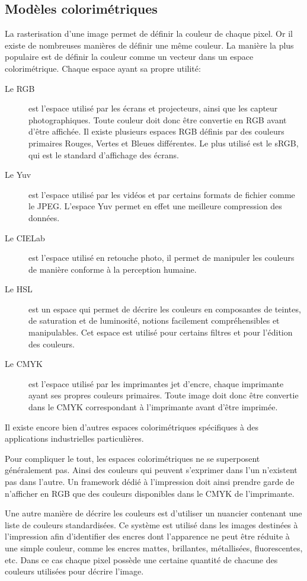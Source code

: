 		\subsection{Modèles colorimétriques}
			La rasterisation d'une image permet de définir la couleur de chaque pixel. Or il existe de nombreuses manières de définir une même couleur.
			La manière la plus populaire est de définir la couleur comme un vecteur dans un espace colorimétrique. Chaque espace ayant sa propre utilité:
			\begin{description}
				\item[Le RGB] est l'espace utilisé par les écrans et projecteurs, ainsi que les capteur photographiques. Toute couleur doit donc être
				convertie en RGB avant d'être affichée. Il existe plusieurs espaces RGB définis par des couleurs primaires Rouges, Vertes et Bleues différentes.
				Le plus utilisé est le sRGB, qui est le standard d'affichage des écrans\cite{reviewrgb}.
				\item[Le Yuv] est l'espace utilisé par les vidéos et par certains formats de fichier comme le JPEG.
				L'espace Yuv permet en effet une meilleure compression des données.
				\item[Le CIELab] est l'espace utilisé en retouche photo, il permet de manipuler les couleurs de manière conforme à la perception humaine.
				\item[Le HSL] est un espace qui permet de décrire les couleurs en composantes de teintes, de saturation et de luminosité, notions
				facilement compréhensibles et manipulables. Cet espace est utilisé pour certains filtres et pour l'édition des couleurs.
				\item[Le CMYK] est l'espace utilisé par les imprimantes jet d'encre, chaque imprimante ayant ses propres couleurs primaires. 
				Toute image doit donc être convertie dans le CMYK correspondant à l'imprimante avant d'être imprimée.
			\end{description}
			Il existe encore bien d'autres espaces colorimétriques spécifiques à des applications industrielles particulières. 

			Pour compliquer le tout, les espaces colorimétriques ne se superposent géné\-ralement pas. Ainsi des couleurs qui peuvent s'exprimer dans l'un n'existent pas
			dans l'autre. Un framework dédié à l'impression doit ainsi prendre garde de n'afficher en RGB que des couleurs disponibles dans le CMYK de l'imprimante.

			Une autre manière de décrire les couleurs est d'utiliser un nuancier contenant une liste de couleurs standardisées. Ce système est utilisé dans les images destinées à l'impression
			afin d'identifier des encres dont l'apparence ne peut être réduite à une simple couleur, comme les encres mattes, brillantes, métallisées,
			fluorescentes, etc. Dans ce cas chaque pixel possède une certaine quantité de chacune des  couleurs utilisées pour décrire l'image.


